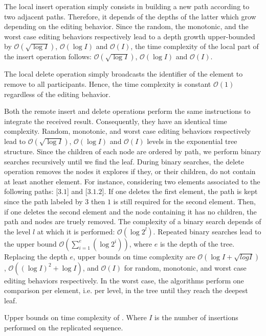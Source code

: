 The local insert operation simply consists in building a new path according to
two adjacent paths. Therefore, it depends of the depths of the latter which grow
depending on the editing behavior. Since the random, the monotonic, and the
worst case editing behaviors respectively lead to a depth growth upper-bounded
by $\mathcal{O}(\sqrt{\log I})$, $\mathcal{O}(\log I)$ and $\mathcal{O}(I)$, the
time complexity of the local part of the insert operation follows:
$\mathcal{O}(\sqrt{\log I})$, $\mathcal{O}(\log I)$ and $\mathcal{O}(I)$.

The local delete operation simply broadcasts the identifier of the element to
remove to all participants. Hence, the time complexity is constant
$\mathcal{O}(1)$ regardless of the editing behavior.

Both the remote insert and delete operations perform the same instructions to
integrate the received result. Consequently, they have an identical time
complexity. Random, monotonic, and worst case editing behaviors respectively
lead to $\mathcal{O}(\sqrt{\log I})$, $\mathcal{O}(\log I)$ and $\mathcal{O}(I)$
levels in the exponential tree structure. Since the children of each node are
ordered by path, we perform binary searches recursively until we find the
leaf. During binary searches, the delete operation removes the nodes it explores
if they, or their children, do not contain at least another element. For
instance, considering two elements associated to the following paths: [$3.1$]
and [$3.1.2$]. If one deletes the first element, the path is kept since the path
labeled by $3$ then $1$ is still required for the second element. Then, if one
deletes the second element and the node containing it has no children, the path
and nodes are truely removed. The complexity of a binary search depends of the
level $l$ at which it is performed: $\mathcal{O}(\log 2^l)$. Repeated binary
searches lead to the upper bound
$\mathcal{O}(\textstyle\sum\nolimits_{i=1}^{e}(\log 2^i))$, where $e$ is the
depth of the tree. Replacing the depth $e$, upper bounds on time complexity are
$\mathcal{O}(\log I + \sqrt{log I})$, $\mathcal{O}((\log I)^2+\log I)$, and
$\mathcal{O}(I)$ for random, monotonic, and worst case editing behaviors
respectively. In the worst case, the algorithms perform one comparison per
element, i.e. per level, in the tree until they reach the deepest leaf.


\begin{table}
  \caption{\label{table:lseqtime}
    Upper bounds on time complexity of \LSEQ. Where $I$ is the number of 
    insertions performed on the replicated sequence.}
  \centering
  
\end{table}

